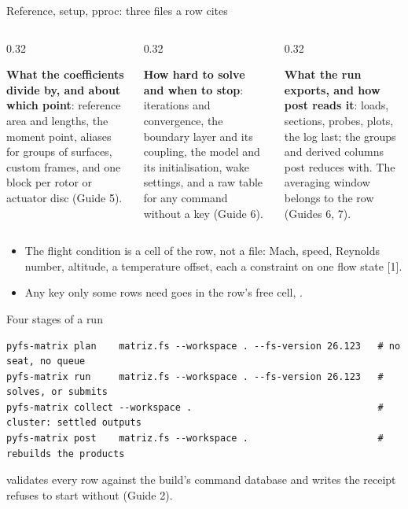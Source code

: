 \begin{frame}{Reference, setup, pproc: three files a row cites}
\begin{columns}[T]
\begin{column}{0.32\textwidth}
\begin{block}{}
\small \textbf{What the coefficients divide by, and about which point}:
reference area and lengths, the moment point, aliases for groups of
surfaces, custom frames, and one block per rotor or actuator disc
(Guide 5).
\end{block}
\end{column}
\begin{column}{0.32\textwidth}
\begin{block}{}
\small \textbf{How hard to solve and when to stop}: iterations and
convergence, the boundary layer and its coupling, the model and its
initialisation, wake settings, and a raw table for any command without a key
(Guide 6).
\end{block}
\end{column}
\begin{column}{0.32\textwidth}
\begin{block}{}
\small \textbf{What the run exports, and how post reads it}: loads, sections,
probes, plots, the log last; the groups and derived columns post reduces
with. The averaging window belongs to the row (Guides 6, 7).
\end{block}
\end{column}
\end{columns}
\vspace{2mm}
\begin{itemize}\small
  \item The flight condition is a cell of the row, not a file: Mach, speed,
        Reynolds number, altitude, a temperature offset, each a constraint on
        one flow state [1].
  \item Any key only some rows need goes in the row's free cell,
        .
\end{itemize}
\end{frame}

\begin{frame}[fragile]{Four stages of a run}
\begin{lstlisting}[style=ftsbase]
pyfs-matrix plan    matriz.fs --workspace . --fs-version 26.123   # no seat, no queue
pyfs-matrix run     matriz.fs --workspace . --fs-version 26.123   # solves, or submits
pyfs-matrix collect --workspace .                                 # cluster: settled outputs
pyfs-matrix post    matriz.fs --workspace .                       # rebuilds the products
\end{lstlisting}
{\small {} validates every row against the build's command database
and writes the receipt  refuses to start without (Guide 2).\par}
\end{frame}

